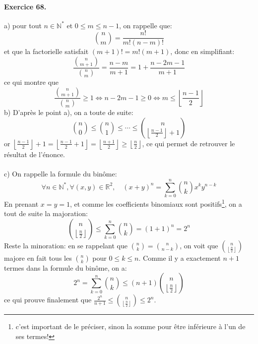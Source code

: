 \documentclass[a4paper,11pt]{article}
\begin{document}
\paragraph{Exercice 68.} a) pour tout $n\in\mathbb{N}^*$ et $0\leq m \leq n-1$, on rappelle que:
\[
\binom{n}{m} = \frac{n!}{m!(n-m)!}
\]
et que la factorielle satisfait $(m+1)!=m!(m+1)$, donc en simplifiant:
\[
\frac{\binom{n}{m+1} }{\binom{n}{m} } = \frac{n-m}{m+1} = 1+\frac{n-2m-1}{m+1}
\]
ce qui montre que 
\[
\frac{\binom{n}{m+1}}{\binom{n}{m}}  \geq 1 \Leftrightarrow n-2m-1 \geq 0 \Leftrightarrow  m \leq \left\lfloor \frac{n-1}{2} \right\rfloor
\]
b) D’après le point a), on a toute de suite:
\[
\binom{n}{0} \leq \binom{n}{1} \leq \cdots \leq \binom{n}{\left\lfloor \frac{n-1}{2} \right\rfloor+1}
\]
or $\left\lfloor \frac{n-1}{2} \right\rfloor+1 =  \left\lfloor \frac{n-1}{2} +1\right\rfloor = \left\lfloor \frac{n+1}{2} \right\rfloor \geq \left\lfloor \frac{n}{2} \right\rfloor$, ce qui permet de retrouver le résultat de l’énonce.\\ \\
c) On rappelle la formule du binôme: 
\[
\forall n \in \mathbb{N}^*, \forall (x,y)\in\mathbb{R}^2, \quad (x+y)^n=\sum_{k=0}^n{\binom{n}{k}x^ky^{n-k}} 
\]
En prenant $x=y=1$, et comme les coefficients binomiaux sont positifs\footnote{c'est important de le préciser, sinon la somme pour être inférieure à l'un de ses termes!}, on a tout de suite la majoration:
\[
\binom{n}{\left\lfloor \frac{n}{2} \right\rfloor} \leq \sum_{k=0}^n{\binom{n}{k}} = (1+1)^n = 2^n
\]
Reste la minoration: en se rappelant que $\binom{n}{k}=\binom{n}{n-k}$, on voit que $\binom{n}{\left\lfloor \frac{n}{2} \right\rfloor}$ majore en fait tous les $\binom{n}{k}$ pour $0\leq k \leq n$. Comme il y a exactement $n+1$ termes dans la formule du binôme, on a:
\[
2^n = \sum_{k=0}^n{\binom{n}{k}} \leq (n+1)\binom{n}{\left\lfloor \frac{n}{2} \right\rfloor}
\]
ce qui prouve finalement que $\frac{2^n}{n+1}\leq \binom{n}{\left\lfloor \frac{n}{2} \right\rfloor} \leq 2^n $.
\end{document}
